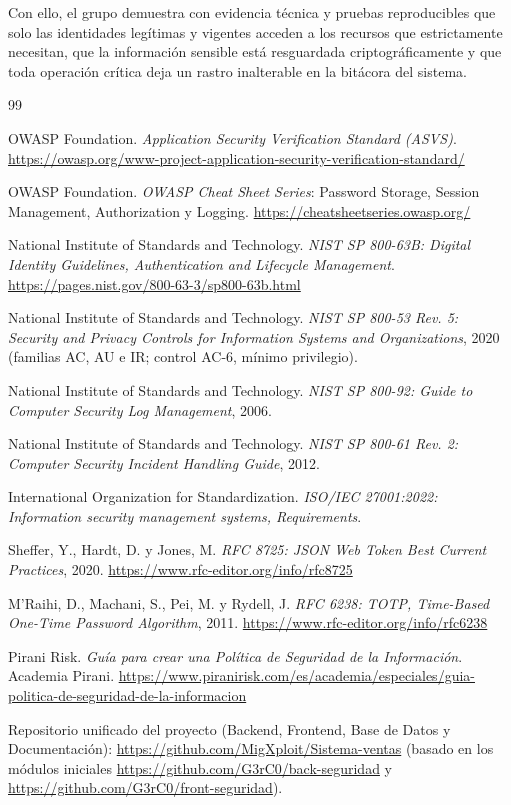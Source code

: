 \documentclass[12pt,letterpaper]{article}
\begin{document}
Con ello, el grupo demuestra con evidencia técnica y pruebas reproducibles que solo las identidades legítimas y vigentes acceden a los recursos que estrictamente necesitan, que la información sensible está resguardada criptográficamente y que toda operación crítica deja un rastro inalterable en la bitácora del sistema.

\renewcommand{\refname}{BIBLIOGRAFÍA}
\begin{thebibliography}{99}

 OWASP Foundation. \textit{Application Security Verification Standard (ASVS)}. \url{https://owasp.org/www-project-application-security-verification-standard/}

 OWASP Foundation. \textit{OWASP Cheat Sheet Series}: Password Storage, Session Management, Authorization y Logging. \url{https://cheatsheetseries.owasp.org/}

 National Institute of Standards and Technology. \textit{NIST SP 800-63B: Digital Identity Guidelines, Authentication and Lifecycle Management}. \url{https://pages.nist.gov/800-63-3/sp800-63b.html}

 National Institute of Standards and Technology. \textit{NIST SP 800-53 Rev. 5: Security and Privacy Controls for Information Systems and Organizations}, 2020 (familias AC, AU e IR; control AC-6, mínimo privilegio).

 National Institute of Standards and Technology. \textit{NIST SP 800-92: Guide to Computer Security Log Management}, 2006.

 National Institute of Standards and Technology. \textit{NIST SP 800-61 Rev. 2: Computer Security Incident Handling Guide}, 2012.

 International Organization for Standardization. \textit{ISO/IEC 27001:2022: Information security management systems, Requirements}.

 Sheffer, Y., Hardt, D. y Jones, M. \textit{RFC 8725: JSON Web Token Best Current Practices}, 2020. \url{https://www.rfc-editor.org/info/rfc8725}

 M'Raihi, D., Machani, S., Pei, M. y Rydell, J. \textit{RFC 6238: TOTP, Time-Based One-Time Password Algorithm}, 2011. \url{https://www.rfc-editor.org/info/rfc6238}

 Pirani Risk. \textit{Guía para crear una Política de Seguridad de la Información}. Academia Pirani. \url{https://www.piranirisk.com/es/academia/especiales/guia-politica-de-seguridad-de-la-informacion}

 Repositorio unificado del proyecto (Backend, Frontend, Base de Datos y Documentación): \url{https://github.com/MigXploit/Sistema-ventas} (basado en los módulos iniciales \url{https://github.com/G3rC0/back-seguridad} y \url{https://github.com/G3rC0/front-seguridad}).
\end{thebibliography}
\end{document}
